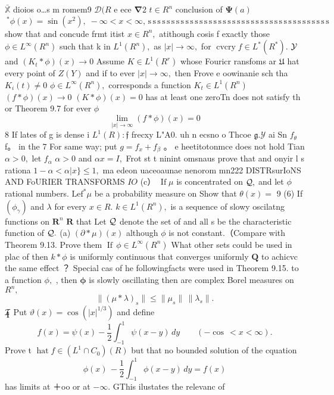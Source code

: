 $\bar{\mathbb{X}}$ dioios o…s m romem9 ${\mathcal{D}}(R$ e ece $\mathbf{\nabla}2$ $t\in R^{n}$ conclusion of $\mathbf{\Psi}(a)$ $\ ^{*}\phi(x)=\sin\left(x^{2}\right),\;-\infty<x<\infty,\,{\mathrm{s}}\,{\mathrm{s}}\,{\mathrm{s}}\,{\mathrm{s}}\,{\mathrm{s}}\,{\mathrm{s}}\,{\mathrm{s}}\,{\mathrm{s}}\,{\mathrm{s}}\,{\mathrm{s}}\,{\mathrm{s}}\,{\mathrm{s}}\,{\mathrm{s}}\,{\mathrm{s}}\,{\mathrm{s}}\,{\mathrm{s}}\,{\mathrm{s}}\,{\mathrm{s}}\,{\mathrm{s}}\,{\mathrm{s}}\,{\mathrm{s}}\,{\mathrm{s}}\,{\mathrm{s}}\,{\mathrm{s}}\,{\mathrm{s}}\,{\mathrm{s}}\,{\mathrm{s}}\,{\mathrm{s}}\,{\mathrm{s}}\,{\mathrm{s}}\,{\mathrm{s}}\,{\mathrm{s}}\,{\mathrm{s}}\,{\mathrm{s}}\,{\mathrm{s}}\,{\mathrm{s}}\,{\mathrm{s}}\,{\mathrm{s}}\,{\mathrm{s}}$ show that and concude frmt itist $x\in R^{n},$ atithough cosis f exactly those $\phi\in L^{\infty}(R^{n})$ such that k in $L^{1}(R^{n}),$ as $|x|\to\infty,$ for $\operatorname{cvcry}f\in L^{*}(R^{*}).$ ${\cal{Y}}$ and $(K_{t}*\phi)(x)\to0$ Assume $K\in L^{1}(R^{r})$ whose Fouricr ransfoms ar ${\mathfrak{U}}$ hat every point of $\scriptstyle{Z(Y)}$ and if to ever $|x|\to\infty,$ then Frove e oowinanie sch tha $K_{i}(t)\neq0$ $\phi\in L^{\infty}(R^{n}),$ corresponds a function $K_{t}\in L^{1}(R^{n})$ $(f*\phi)(x)\to0$ $(K*\phi)(x)=0$ has at least one zeroTn does not satisfy th or Theorem 9.7 for ever $\phi$ $$ \operatorname*{lim}_{|x|\to\infty}(f*\phi)(x)=0 $$ 8 If lates of g is dense i $L^{1}(R):{\mathfrak{f}}$ frecxy L"A0. uh n ecsno o Thcoe ${\mathfrak{g}}.{\mathcal{Y}}$ ai Sn $f_{\theta}$ f。 in the 7 For same way; put $g=f_{x}+f_{\beta}$ 。 e heetitotonmce does not hold Tian $\scriptstyle\alpha>0,$ let $f_{\alpha}$ $\scriptstyle\alpha>0$ and $\alpha x=I,$ Frot st t ninint omsnaus prove that and onyir l s rationa $1-\alpha<\alpha|x\}\leq1,$ ma edeon uaceoaunae nenorom mn222 DISTRsurIoNS AND FoURIER TRANSFORMS $I O$ (c） $\operatorname{If}\mu$ is concentrated on ${\cal Q},$ and let $\phi$ rational numbers. ${\mathrm{Lef}}^{*}\mu$ be a probability measure on Show that $\scriptstyle\theta(x)=$ 9 (6) If $\scriptstyle(\phi_{\gamma})$ and $\lambda$ for every $x\in R.$ $k\in L^{1}(R^{n}),$ is a sequence of slowy oscilatng functions on ${\boldsymbol{R}}^{n}$ ${\boldsymbol{R}}$ that Let ${\cal{Q}}$ denote the set of and ${\mathrm{all}}$ s be the characteristic function of ${\cal Q}.$ (a) $(\partial*\mu)(x)$ although $\phi$ is not constant.（Compare with Theorem 9.13. Prove them $\operatorname{If}\,\phi\in L^{\infty}(R^{n})$ What other sets could be used in plac of then $k\ast\phi$ is uniformly continuous that converges uniformly ${\boldsymbol{Q}}$ to achicvc the same effect ？ Special cas of he followingfacts were used in Theorem 9.15. to a function $\phi,$ , then $\boldsymbol{\phi}$ is slowly oscillating then are complex Borel measures on $\textstyle R^{n}\!,$ $$ \|(\mu*\lambda)_{s}\|\leq\|\mu_{s}\|\,\|\lambda_{s}\|. $$ ${\cal I}_{\llap{I}}$ Put $\vartheta(x)=\cos\left(|x|^{1/3}\right)$ and define $$ f(x)=\psi(x)-\frac{1}{2}\int_{-1}^{1}\psi(x-y)\,d y\qquad(-\cos\,<x<\infty). $$ Prove t $\operatorname{hat}f\in(L^{1}\cap C_{0})(R)$ but that no bounded solution of the cquation $$ \phi(x)\,-{\frac{1}{2}}\int_{-1}^{1}\phi(x-y)\,d y=f(x) $$ has limits at ＋oo or at $-\infty.$ GThis ilustates the relevanc of 